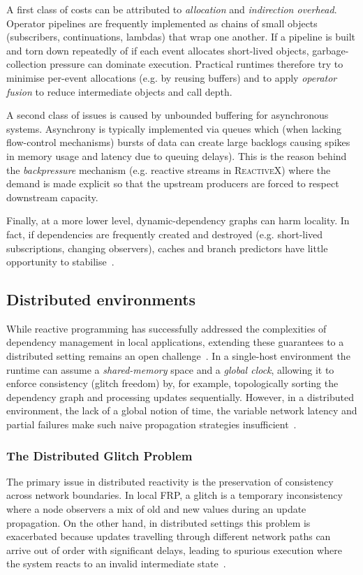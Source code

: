 A first class of costs can be attributed to \emph{allocation} and
\emph{indirection overhead}. Operator pipelines are frequently implemented as
chains of small objects (subscribers, continuations, lambdas) that wrap one
another. If a pipeline is built and torn down repeatedly of if each event
allocates short-lived objects, garbage-collection pressure can dominate
execution. Practical runtimes therefore try to minimise per-event allocations
(e.g. by reusing buffers) and to apply \emph{operator fusion} to reduce
intermediate objects and call depth.

A second class of issues is caused by unbounded buffering for asynchronous
systems. Asynchrony is typically implemented via queues which (when lacking
flow-control mechanisms) bursts of data can create large backlogs causing
spikes in memory usage and latency due to queuing delays). This is the reason
behind the \emph{backpressure} mechanism (e.g. reactive streams in
\textsc{ReactiveX}) where the demand is made explicit so that the upstream
producers are forced to respect downstream capacity.

Finally, at a more lower level, dynamic-dependency graphs can harm locality. In
fact, if dependencies are frequently created and destroyed (e.g. short-lived
subscriptions, changing observers), caches and branch predictors have little
opportunity to stabilise~\cite{mukkara2017CGSECMLGP, mukkara2018ELGATHATS}.

\subsection{Distributed environments}

While reactive programming has successfully addressed the complexities of
dependency management in local applications, extending these guarantees to a
distributed setting remains an open challenge~\cite{bainomugisha2013SRP}. In a
single-host environment the runtime can assume a \emph{shared-memory} space and
a \emph{global clock}, allowing it to enforce consistency (glitch freedom) by,
for example, topologically sorting the dependency graph and processing updates
sequentially. However, in a distributed environment, the lack of a global
notion of time, the variable network latency and partial failures make such
naive propagation strategies insufficient~\cite{salvaneschi2013TDRP}.

\subsubsection{The Distributed Glitch Problem}
The primary issue in distributed reactivity is the preservation of consistency
across network boundaries. In local \ac{FRP}, a glitch is a temporary
inconsistency where a node observers a mix of old and new values during an
update propagation. On the other hand, in distributed settings this problem is
exacerbated because updates travelling through different network paths can
arrive out of order with significant delays, leading to spurious execution
where the system reacts to an invalid intermediate
state~\cite{salvaneschi2013TDRP}.

